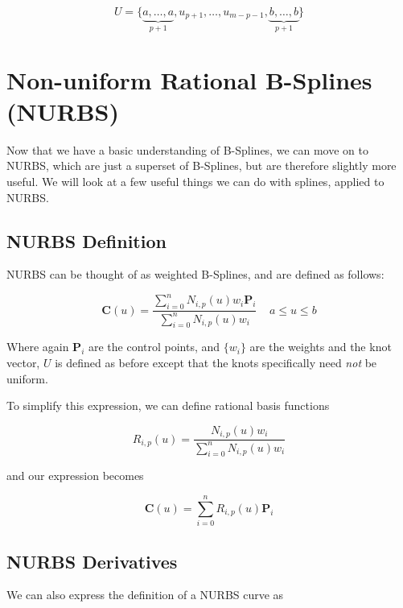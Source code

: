 \begin{equation} U = \{\underbrace{a,\ldots,a}_{p+1},u_{p+1},\ldots,u_{m-p-1},\underbrace{b,\ldots,b}_{p+1} \}  \end{equation}



\section{Non-uniform Rational B-Splines (NURBS)}
Now that we have a basic understanding of B-Splines, we can move on to NURBS, which are just a superset of B-Splines, but are therefore slightly  more useful. We will look at a few useful things we can do with splines, applied to NURBS.

\subsection{NURBS Definition}
NURBS can be thought of as weighted B-Splines, and are defined as follows:

\begin{equation}\label{eqn:nurbsdef} \textbf{C}(u) = \frac{ \displaystyle \sum^n_{i=0}N_{i,p}(u) w_i \textbf{P}_i }{ \displaystyle \sum^n_{i=0}N_{i,p}(u) w_i }~~~~~a\leq u \leq b \end{equation}  

Where again $\textbf{P}_i$ are the control points, and $\{w_i\}$ are the weights and the knot vector, $U$ is defined as before except that the knots specifically need \textit{not} be uniform.

To simplify this expression, we can define rational basis functions

\begin{equation} R_{i,p}(u) = \frac{ N_{i,p}(u) w_i } { \displaystyle \sum^n_{i=0}N_{i,p}(u) w_i }\end{equation}  

and our expression becomes

\begin{equation} \textbf{C}(u) = \sum^n_{i=0} R_{i,p}(u) \textbf{P}_i  \end{equation}  


\subsection{NURBS Derivatives}
We can also express the definition of a NURBS curve as

